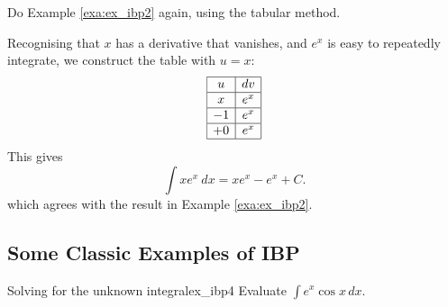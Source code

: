 \begin{example}{}{}
Do Example \ref{exa:ex_ibp2} again, using the tabular method.
\end{example}

\begin{solution}
Recognising that $ x $	has a derivative that vanishes, and $ e^x $ is easy to repeatedly integrate, we construct the table with $ u=x:$
$$\begin{array}{|c|c|}
\hline
u& dv\\\hline
x& e^x\\\hline
-1& e^x\\\hline
+0& e^x\\\hline
\end{array}$$
This gives
$$\int xe^x\ dx = xe^x - e^x + C.$$
which agrees with the result in Example \ref{exa:ex_ibp2}. 
\end{solution}


\subsection*{Some Classic Examples of IBP}

\begin{example}{Solving for the unknown integral}{ex_ibp4}
	{
	Evaluate $\displaystyle \int e^x\cos x \,dx$.}	
\end{example}	

